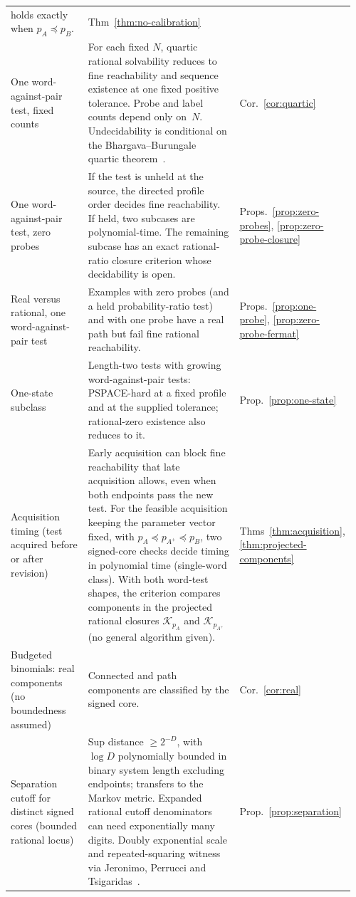 \begin{table}[tp]
\begin{tabular}{@{}>{\raggedright\arraybackslash}p{0.25\linewidth}p{0.60\linewidth}p{0.11\linewidth}@{}}
holds exactly when $p_A\preceq p_B$. & Thm~\ref{thm:no-calibration}\\
One word-against-pair test, fixed counts & For each fixed $N$, quartic
rational solvability reduces to fine reachability and sequence existence at
one fixed positive tolerance. Probe and label counts depend only on~$N$.
Undecidability is conditional on the Bhargava--Burungale quartic
theorem~\cite[Corollary~1.2(3)]{bhargavaburungale}. & Cor.~\ref{cor:quartic}\\
One word-against-pair test, zero probes & If the test is unheld at the
source, the directed profile order decides fine reachability. If held, two
subcases are polynomial-time. The remaining subcase has an exact
rational-ratio closure criterion whose decidability is open. & Props.~\ref{prop:zero-probes},
\ref{prop:zero-probe-closure}\\
Real versus rational, one word-against-pair test & Examples with zero probes
(and a held probability-ratio test) and with one probe have a real path but
fail fine rational reachability. & Props.~\ref{prop:one-probe},
\ref{prop:zero-probe-fermat}\\
One-state subclass & Length-two tests with growing word-against-pair tests:
PSPACE-hard at a fixed profile and at the supplied tolerance; rational-zero
existence also reduces to it. & Prop.~\ref{prop:one-state}\\
Acquisition timing (test acquired before or after revision) & Early
acquisition can block fine reachability that late acquisition allows, even when
both endpoints pass the new test. For the feasible acquisition keeping the
parameter vector fixed, with $p_A\preceq p_{A^+}\preceq p_B$, two signed-core
checks decide timing in polynomial time (single-word class). With both
word-test shapes, the criterion compares components in the projected rational
closures $\mathcal K_{p_A}$ and $\mathcal K_{p_{A^+}}$ (no general algorithm
given). & Thms~\ref{thm:acquisition}, \ref{thm:projected-components}\\
Budgeted binomials: real components (no boundedness assumed) & Connected and
path components are classified by the signed core. & Cor.~\ref{cor:real}\\
Separation cutoff for distinct signed cores (bounded rational locus) & Sup
distance $\ge 2^{-D}$, with $\log D$ polynomially bounded in binary system
length excluding endpoints; transfers to the Markov metric. Expanded rational
cutoff denominators can need exponentially many digits. Doubly exponential
scale and repeated-squaring witness via Jeronimo, Perrucci and
Tsigaridas~\cite{jeronimoperruccitsigaridas}. & Prop.~\ref{prop:separation}\\
\bottomrule
\end{tabular}
\end{table}

